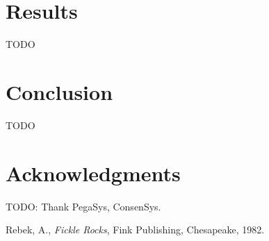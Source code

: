 \documentclass[]{aiaa-tc}%
\begin{document}
\section{Results}

TODO

\section{Conclusion}

TODO

\section*{Acknowledgments}

TODO: Thank PegaSys, ConsenSys.

\begin{thebibliography}{9}%
 Rebek, A., {\it Fickle Rocks}, Fink Publishing, Chesapeake, 1982.
\end{thebibliography}
\end{document}

